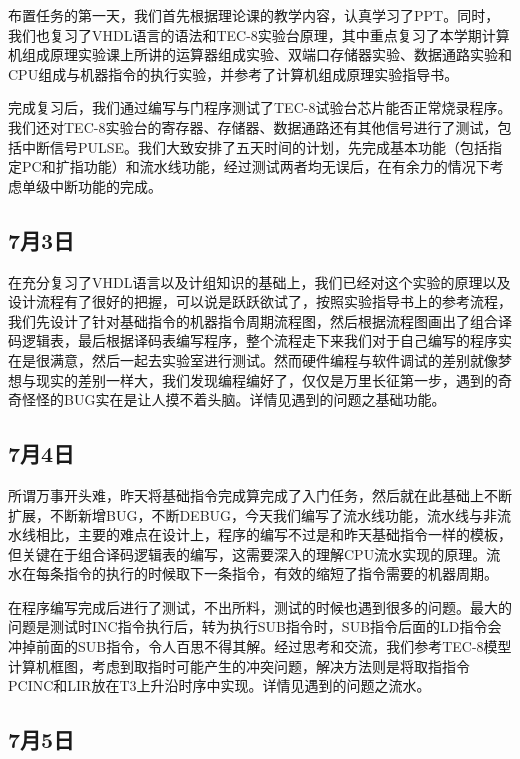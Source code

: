 \documentclass[lang=cn,11pt,a4paper,cite=authornum]{paper}
\begin{document}
布置任务的第一天，我们首先根据理论课的教学内容，认真学习了PPT。同时，我们也复习了VHDL语言的语法和TEC-8实验台原理，其中重点复习了本学期计算机组成原理实验课上所讲的运算器组成实验、双端口存储器实验、数据通路实验和CPU组成与机器指令的执行实验，并参考了计算机组成原理实验指导书。

完成复习后，我们通过编写与门程序测试了TEC-8试验台芯片能否正常烧录程序。我们还对TEC-8实验台的寄存器、存储器、数据通路还有其他信号进行了测试，包括中断信号PULSE。我们大致安排了五天时间的计划，先完成基本功能（包括指定PC和扩指功能）和流水线功能，经过测试两者均无误后，在有余力的情况下考虑单级中断功能的完成。

\subsection{7月3日}

在充分复习了VHDL语言以及计组知识的基础上，我们已经对这个实验的原理以及设计流程有了很好的把握，可以说是跃跃欲试了，按照实验指导书上的参考流程，我们先设计了针对基础指令的机器指令周期流程图，然后根据流程图画出了组合译码逻辑表，最后根据译码表编写程序，整个流程走下来我们对于自己编写的程序实在是很满意，然后一起去实验室进行测试。然而硬件编程与软件调试的差别就像梦想与现实的差别一样大，我们发现编程编好了，仅仅是万里长征第一步，遇到的奇奇怪怪的BUG实在是让人摸不着头脑。详情见遇到的问题之基础功能。

\subsection{7月4日}

所谓万事开头难，昨天将基础指令完成算完成了入门任务，然后就在此基础上不断扩展，不断新增BUG，不断DEBUG，今天我们编写了流水线功能，流水线与非流水线相比，主要的难点在设计上，程序的编写不过是和昨天基础指令一样的模板，但关键在于组合译码逻辑表的编写，这需要深入的理解CPU流水实现的原理。流水在每条指令的执行的时候取下一条指令，有效的缩短了指令需要的机器周期。

在程序编写完成后进行了测试，不出所料，测试的时候也遇到很多的问题。最大的问题是测试时INC指令执行后，转为执行SUB指令时，SUB指令后面的LD指令会冲掉前面的SUB指令，令人百思不得其解。经过思考和交流，我们参考TEC-8模型计算机框图，考虑到取指时可能产生的冲突问题，解决方法则是将取指指令PCINC和LIR放在T3上升沿时序中实现。详情见遇到的问题之流水。

\subsection{7月5日}
\end{document}
